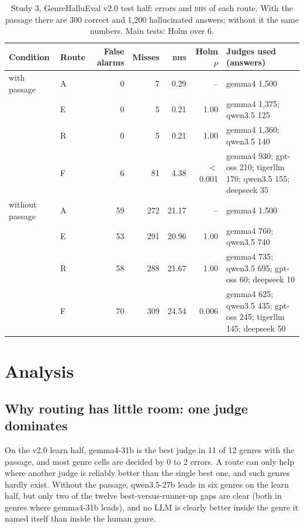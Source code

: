 \documentclass[pdflatex,sn-apa]{sn-jnl}
\newcommand{\BHS}{\textsc{bhs}}
\begin{document}
\begin{table}[t]
\centering\small
\caption{Study 3, GenreHalluEval v2.0 test half: errors and \BHS{} of each route. With the passage there are 300
correct and 1,200 hallucinated answers; without it the same numbers. Main tests: Holm over 6.}\label{tab:v2}
\begin{tabularx}{\textwidth}{@{}llrrrr>{\raggedright\arraybackslash}X@{}}
\toprule
Condition & Route & False alarms & Misses & \BHS{} & Holm $p$ & Judges used (answers) \\
\midrule
with passage & A & 0 & 7 & 0.29 & -- & gemma4 1,500 \\
 & E & 0 & 5 & 0.21 & 1.00 & gemma4 1,375; qwen3.5 125 \\
 & R & 0 & 5 & 0.21 & 1.00 & gemma4 1,360; qwen3.5 140 \\
 & F & 6 & 81 & 4.38 & $<$0.001 & gemma4 930; gpt-oss 210; tigerllm 170; qwen3.5 155; deepseek 35 \\
\midrule
without passage & A & 59 & 272 & 21.17 & -- & gemma4 1,500 \\
 & E & 53 & 291 & 20.96 & 1.00 & gemma4 760; qwen3.5 740 \\
 & R & 58 & 288 & 21.67 & 1.00 & gemma4 735; qwen3.5 695; gpt-oss 60; deepseek 10 \\
 & F & 70 & 309 & 24.54 & 0.006 & gemma4 625; qwen3.5 435; gpt-oss 245; tigerllm 145; deepseek 50 \\
\bottomrule
\end{tabularx}
\end{table}

\section{Analysis}

\subsection{Why routing has little room: one judge dominates}

On the v2.0 learn half, gemma4-31b is the best judge in 11 of 12 genres with the passage, and most genre cells are
decided by 0 to 2 errors. A route can only help where another judge is reliably better than the single best one, and
such genres hardly exist. Without the passage, qwen3.5-27b leads in six genres on the learn half, but only two of the
twelve best-versus-runner-up gaps are clear (both in genres where gemma4-31b leads), and no LLM is clearly better inside
the genre it named itself than inside the human genre.
\end{document}
